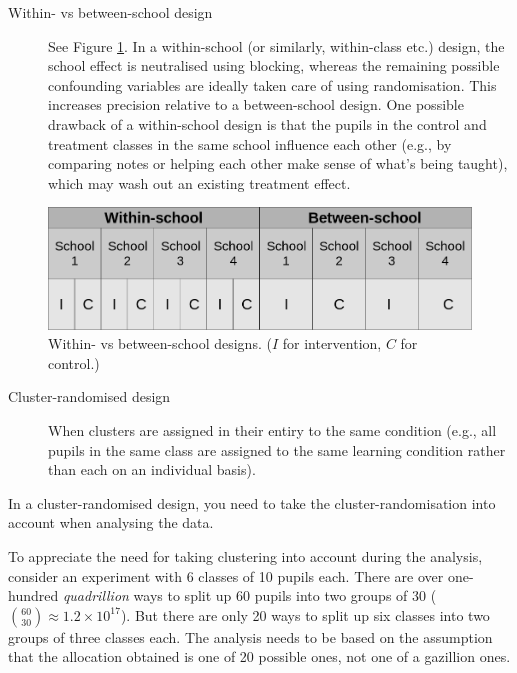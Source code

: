 \documentclass[a4paper]{tufte-book}\usepackage[]{graphicx}\usepackage[]{xcolor}
\begin{document}
\begin{description}
  \item[Within- vs between-school design] See Figure \ref{fig:withinschool}.
  In a within-school (or similarly, within-class etc.) design,
  the school effect is neutralised using blocking, whereas
  the remaining possible confounding variables are ideally
  taken care of using randomisation. This increases precision
  relative to a between-school design.
  One possible drawback of a within-school design is that
  the pupils in the control and treatment classes in the same
  school influence each other (e.g., by comparing notes
  or helping each other make sense of what's being taught),
  which may wash out an existing treatment effect.
\end{description}

\begin{figure}
  \includegraphics[width=\textwidth]{figure/within_between_school}
  \caption{Within- vs between-school designs. ($I$ for intervention, $C$ for control.)}
  \label{fig:withinschool}
\end{figure}

\begin{description}
 \item[Cluster-randomised design] When clusters are
 assigned in their entiry to the same condition (e.g.,
 all pupils in the same class are assigned to the same
 learning condition rather than each on an individual basis).
\end{description}

\begin{framed}
 In a cluster-randomised design, you need to
 take the cluster-randomisation into account when analysing the data.
\end{framed}

To appreciate the need for taking clustering into account during the analysis, consider an experiment with 6 classes of 10 pupils each. 
There are over one-hundred \emph{quadrillion} ways to split up 60 pupils into two groups of 30 (${60 \choose 30} \approx 1.2 \times 10^{17}$). 
But there are only 20 ways to split up six classes into two groups of three classes each. 
The analysis needs to be based on the assumption that the allocation obtained is one of 20 possible ones, not one of a gazillion ones.
\end{document}
